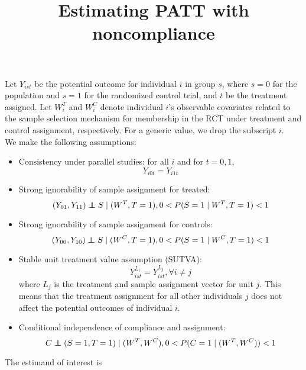 \documentclass{article}
\title{Estimating PATT with noncompliance}
\newcommand{\pr}{P} %
\newcommand\independent{\protect\mathpalette{\protect\independenT}{\perp}}
\def\independenT#1#2{\mathrel{\rlap{$#1#2$}\mkern2mu{#1#2}}}
\begin{document}
\maketitle


Let $Y_{ist}$ be the potential outcome for individual $i$ in group $s$, where $s=0$ for the population and $s=1$ for the randomized control trial, and $t$ be the treatment assigned.  Let $W_i^T$ and $W_i^C$ denote individual $i$'s observable covariates related to the sample selection mechanism for membership in the RCT under treatment and control assignment, respectively. For a generic value, we drop the subscript $i$.  \\


We make the following assumptions:
\begin{itemize}
\item{Consistency under parallel studies: for all $i$ and for $t=0, 1$,
\begin{equation}\label{consistency}
Y_{i0t} = Y_{i1t}
\end{equation}}
\item{Strong ignorability of sample assignment for treated:
\begin{equation}\label{si_treat}
(Y_{01}, Y_{11}) \independent S \mid (W^T, T=1), 0 < \pr(S=1 \mid W^T, T=1) <1 
\end{equation}}
\item{Strong ignorability of sample assignment for controls:
\begin{equation}\label{si_ctrl}
(Y_{00}, Y_{10}) \independent S \mid (W^C, T=1), 0 < \pr(S=1 \mid W^C, T=1) <1 
\end{equation}}
\item{Stable unit treatment value assumption (SUTVA):
\begin{equation}\label{sutva}
Y_{ist}^{L_i} = Y_{ist}^{L_j},  \forall i \neq j
\end{equation}
where $L_j$ is the treatment and sample assignment vector for unit $j$.  This means that the treatment assignment for all other individuals $j$ does not affect the potential outcomes of individual $i$.}
\item{Conditional independence of compliance and assignment:
\begin{equation}\label{compl}
C \independent (S=1, T=1) \mid (W^T, W^C), 0 < \pr(C = 1 \mid (W^T, W^C)) < 1
\end{equation}
}
\end{itemize}


The estimand of interest is 
\end{document}
